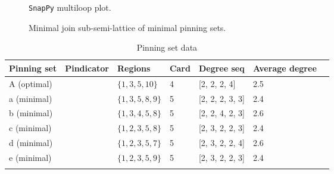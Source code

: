 \documentclass{article}%
\begin{document}
\begin{multicols}{2}
\begin{figure}[H]
\centering

\caption{\texttt{SnapPy} multiloop plot.}
\label{fig:tex/img/[(12, 1, 13, 2), (6, 3, 7, 4), (10, 5, 11, 6), (14, 7, 15, 8), (4, 9, 5, 10), (16, 11, 1, 12), (8, 13, 9, 14), (2, 15, 3, 16)].svg}
\end{figure}
\columnbreak

\begin{figure}[H]
\centering
\scalebox{0.8}{}
\caption{Minimal join sub-semi-lattice of minimal pinning sets.}
\label{fig:tex/img/[(12, 1, 13, 2), (6, 3, 7, 4), (10, 5, 11, 6), (14, 7, 15, 8), (4, 9, 5, 10), (16, 11, 1, 12), (8, 13, 9, 14), (2, 15, 3, 16)].pgf}
\end{figure}
\end{multicols}

\newpage

\begin{table}[ht]
	\caption{Pinning set data}
	\centering
	\renewcommand{\arraystretch}{1.5}
	\begin{tabularx}{\textwidth}{lXXXXXX}
		\toprule
			Pinning set & Pindicator & Regions & Card & Degree seq & Average degree\\
			\hline
			A (optimal) & {\Huge\textcolor{red0}{\textbullet}} & $\{1,3,5,10\}$ & 4 & [2, 2, 2, 4] & 2.5 \\
			a (minimal) & {\Huge\textcolor{green0}{\textbullet}} & $\{1,3,5,8,9\}$ & 5 & [2, 2, 2, 3, 3] & 2.4 \\
			b (minimal) & {\Huge\textcolor{green15}{\textbullet}} & $\{1,3,4,5,8\}$ & 5 & [2, 2, 4, 2, 3] & 2.6 \\
			c (minimal) & {\Huge\textcolor{green30}{\textbullet}} & $\{1,2,3,5,8\}$ & 5 & [2, 3, 2, 2, 3] & 2.4 \\
			d (minimal) & {\Huge\textcolor{green45}{\textbullet}} & $\{1,2,3,5,7\}$ & 5 & [2, 3, 2, 2, 4] & 2.6 \\
			e (minimal) & {\Huge\textcolor{green60}{\textbullet}} & $\{1,2,3,5,9\}$ & 5 & [2, 3, 2, 2, 3] & 2.4 \\
		\bottomrule \\ 
	\end{tabularx}
\end{table}
\end{document}
